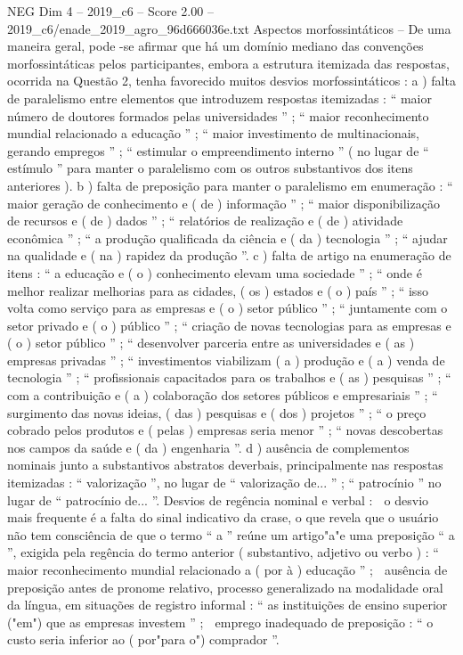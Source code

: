 \begin{textsample}{NEG Dim 4 – 2019\_c6 – Score 2.00 – 2019\_c6/enade\_2019\_agro\_96d666036e.txt}
Aspectos morfossintáticos – De uma maneira geral, pode -se afirmar que há um domínio mediano das convenções morfossintáticas pelos participantes, embora a estrutura itemizada das respostas, ocorrida na Questão 2, tenha favorecido muitos desvios morfossintáticos : a ) falta de paralelismo entre elementos que introduzem respostas itemizadas : “ maior número de doutores formados pelas universidades ” ; “ maior reconhecimento mundial relacionado a educação ” ; “ maior investimento de multinacionais, gerando empregos ” ; “ estimular o empreendimento interno ” ( no lugar de “ estímulo ” para manter o paralelismo com os outros substantivos dos itens anteriores ). b ) falta de preposição para manter o paralelismo em enumeração : “ maior geração de conhecimento e ( de ) informação ” ; “ maior disponibilização de recursos e ( de ) dados ” ; “ relatórios de realização e ( de ) atividade econômica ” ; “ a produção qualificada da ciência e ( da ) tecnologia ” ; “ ajudar na qualidade e ( na ) rapidez da produção ”. c ) falta de artigo na enumeração de itens : “ a educação e ( o ) conhecimento elevam uma sociedade ” ; “ onde é melhor realizar melhorias para as cidades, ( os ) estados e ( o ) país ” ; “ isso volta como serviço para as empresas e ( o ) setor público ” ; “ juntamente com o setor privado e ( o ) público ” ; “ criação de novas tecnologias para as empresas e ( o ) setor público ” ; “ desenvolver parceria entre as universidades e ( as ) empresas privadas ” ; “ investimentos viabilizam ( a ) produção e ( a ) venda de tecnologia ” ; “ profissionais capacitados para os trabalhos e ( as ) pesquisas ” ; “ com a contribuição e ( a ) colaboração dos setores públicos e empresariais ” ; “ surgimento das novas ideias, ( das ) pesquisas e ( dos ) projetos ” ; “ o preço cobrado pelos produtos e ( pelas ) empresas seria menor ” ; “ novas descobertas nos campos da saúde e ( da ) engenharia ”. d ) ausência de complementos nominais junto a substantivos abstratos deverbais, principalmente nas respostas itemizadas : “ valorização ”, no lugar de “ valorização de... ” ; “ patrocínio ” no lugar de “ patrocínio de... ”.
Desvios de regência nominal e verbal :  o desvio mais frequente é a falta do sinal indicativo da crase, o que revela que o usuário não tem consciência de que o termo “ a ” reúne um artigo"a"e uma preposição “ a ”, exigida pela regência do termo anterior ( substantivo, adjetivo ou verbo ) : “ maior reconhecimento mundial relacionado a ( por à ) educação ” ;  ausência de preposição antes de pronome relativo, processo generalizado na modalidade oral da língua, em situações de registro informal : “ as instituições de ensino superior ("em") que as empresas investem ” ;  emprego inadequado de preposição : “ o custo seria inferior ao ( por"para o") comprador ”.

\end{textsample}
